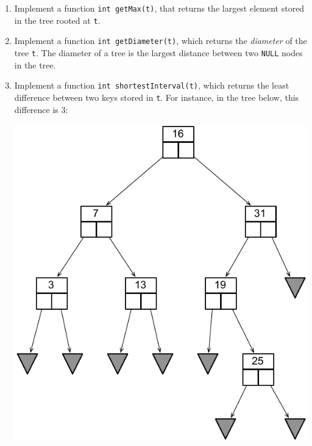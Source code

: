 \documentclass[12pt]{article}
\begin{document}
\begin{enumerate}
\begin{enumerate}
\item Implement a function \texttt{int getMax(t)}, that returns the largest
element stored in the tree rooted at \texttt{t}.

\vspace{5cm}

\item Implement a function \texttt{int getDiameter(t)}, which returns the
{\em diameter} of the tree \texttt{t}.
The diameter of a tree is the largest distance between two \texttt{NULL} nodes
in the tree.

\vspace{5cm}

\item Implement a function \texttt{int shortestInterval(t)}, which returns the
least difference between two keys stored in \texttt{t}.
For instance, in the tree below, this difference is 3:

\includegraphics[scale=0.7]{images/binSearchTree_1}

\end{enumerate}

\end{enumerate}
\end{document}
